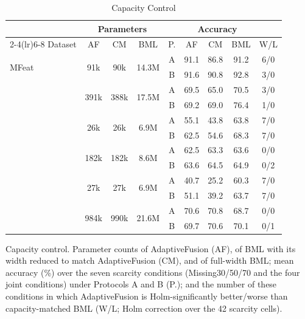 \begin{table}[!t]
\caption{Capacity Control}
\label{tab:capacity}
\centering
\footnotesize
\setlength{\tabcolsep}{2.2pt}
\begin{tabular}{lcccccccc}
\toprule
& \multicolumn{3}{c}{Parameters} & & \multicolumn{3}{c}{Accuracy} & \\
\cmidrule(lr){2-4}\cmidrule(lr){6-8}
Dataset & AF & CM & BML & P. & AF & CM & BML & W/L \\
\midrule
\multirow{2}{*}{MFeat} & \multirow{2}{*}{91k} & \multirow{2}{*}{90k} & \multirow{2}{*}{14.3M} & A & 91.1 & 86.8 & 91.2 & 6/0 \\
 &  &  &  & B & 91.6 & 90.8 & 92.8 & 3/0 \\
\addlinespace[2pt]
\multirow{2}{*}{Caltech} & \multirow{2}{*}{391k} & \multirow{2}{*}{388k} & \multirow{2}{*}{17.5M} & A & 69.5 & 65.0 & 70.5 & 3/0 \\
 &  &  &  & B & 69.2 & 69.0 & 76.4 & 1/0 \\
\addlinespace[2pt]
\multirow{2}{*}{Scene15} & \multirow{2}{*}{26k} & \multirow{2}{*}{26k} & \multirow{2}{*}{6.9M} & A & 55.1 & 43.8 & 63.8 & 7/0 \\
 &  &  &  & B & 62.5 & 54.6 & 68.3 & 7/0 \\
\addlinespace[2pt]
\multirow{2}{*}{BDGP} & \multirow{2}{*}{182k} & \multirow{2}{*}{182k} & \multirow{2}{*}{8.6M} & A & 62.5 & 63.3 & 63.6 & 0/0 \\
 &  &  &  & B & 63.6 & 64.5 & 64.9 & 0/2 \\
\addlinespace[2pt]
\multirow{2}{*}{LandUse} & \multirow{2}{*}{27k} & \multirow{2}{*}{27k} & \multirow{2}{*}{6.9M} & A & 40.7 & 25.2 & 60.3 & 7/0 \\
 &  &  &  & B & 51.1 & 39.2 & 63.7 & 7/0 \\
\addlinespace[2pt]
\multirow{2}{*}{Reuters} & \multirow{2}{*}{984k} & \multirow{2}{*}{990k} & \multirow{2}{*}{21.6M} & A & 70.6 & 70.8 & 68.7 & 0/0 \\
 &  &  &  & B & 69.7 & 70.6 & 70.1 & 0/1 \\
\bottomrule
\end{tabular}
\par\smallskip
\parbox{\linewidth}{\scriptsize Capacity control. Parameter counts of AdaptiveFusion (AF), of BML with its width reduced to match AdaptiveFusion (CM), and of full-width BML; mean accuracy (\%) over the seven scarcity conditions (Missing30/50/70 and the four joint conditions) under Protocols A and B (P.); and the number of these conditions in which AdaptiveFusion is Holm-significantly better/worse than capacity-matched BML (W/L; Holm correction over the 42 scarcity cells).}
\end{table}
